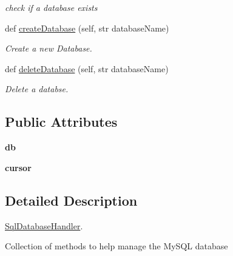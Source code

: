 \begin{DoxyCompactItemize}
\begin{DoxyCompactList}\small\item\em check if a database exists \end{DoxyCompactList}\item 
\mbox{\label{classsql_handler_1_1_sql_database_handler_a51ac0f0db18338a8ff7080a7b87e68e6}} 
def \mbox{\hyperlink{classsql_handler_1_1_sql_database_handler_a51ac0f0db18338a8ff7080a7b87e68e6}{create\+Database}} (self, str database\+Name)
\begin{DoxyCompactList}\small\item\em Create a new Database. \end{DoxyCompactList}\item 
\mbox{\label{classsql_handler_1_1_sql_database_handler_ac85d8cedd7cf5aceb1f68dbad8bf727a}} 
def \mbox{\hyperlink{classsql_handler_1_1_sql_database_handler_ac85d8cedd7cf5aceb1f68dbad8bf727a}{delete\+Database}} (self, str database\+Name)
\begin{DoxyCompactList}\small\item\em Delete a databse. \end{DoxyCompactList}\end{DoxyCompactItemize}
\subsection*{Public Attributes}
\begin{DoxyCompactItemize}
\item 
\mbox{\label{classsql_handler_1_1_sql_database_handler_af3d4b9ea6943276bec88022314ccaa02}} 
{\bfseries db}
\item 
\mbox{\label{classsql_handler_1_1_sql_database_handler_a55ee80197e1de6b576eea840c38d187e}} 
{\bfseries cursor}
\end{DoxyCompactItemize}


\subsection{Detailed Description}
\mbox{\hyperlink{classsql_handler_1_1_sql_database_handler}{Sql\+Database\+Handler}}. 

Collection of methods to help manage the My\+S\+QL database 

